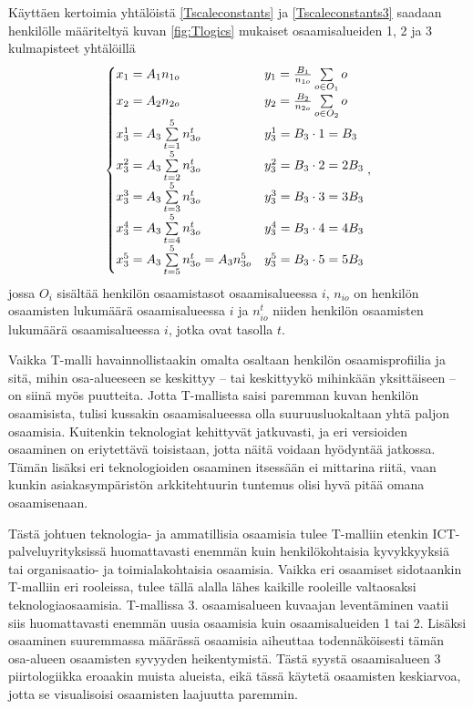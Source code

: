 \documentclass[a4paper,finnish,12pt]{article}
\begin{document}
Käyttäen kertoimia yhtälöistä \eqref{Tscaleconstants} ja \eqref{Tscaleconstants3} saadaan henkilölle määriteltyä kuvan \ref{fig:Tlogics} mukaiset osaamisalueiden 1, 2 ja 3 kulmapisteet yhtälöillä
\begin{equation}
\begin{cases}
x_1 = A_1 n_{1o} & y_1 = \frac{B_1}{n_{1o}} \sum\limits_{o \in O_1} o \\
x_2 = A_2 n_{2o} & y_2 = \frac{B_2}{n_{2o}} \sum\limits_{o \in O_2} o \\
x_3^1 = A_3 \sum\limits_{t = 1}^{5} n_{3o}^t & y_3^1 = B_3 \cdot 1 = B_3 \\
x_3^2 = A_3 \sum\limits_{t = 2}^{5} n_{3o}^t & y_3^2 = B_3 \cdot 2 = 2 B_3 \\
x_3^3 = A_3 \sum\limits_{t = 3}^{5} n_{3o}^t & y_3^3 = B_3 \cdot 3 = 3 B_3 \\
x_3^4 = A_3 \sum\limits_{t = 4}^{5} n_{3o}^t & y_3^4= B_3 \cdot 4 = 4 B_3 \\
x_3^5 = A_3 \sum\limits_{t = 5}^{5} n_{3o}^t = A_3 n_{3o}^5 & y_3^5 = B_3 \cdot 5 = 5 B_3
\end{cases} \\ ,
\end{equation} jossa $O_i$ sisältää henkilön osaamistasot osaamisalueessa $i$, $n_{io}$ on henkilön osaamisten lukumäärä osaamisalueessa $i$ ja $n_{io}^t$ niiden henkilön osaamisten lukumäärä osaamisalueessa $i$, jotka ovat tasolla $t$.

Vaikka T-malli havainnollistaakin omalta osaltaan henkilön osaamisprofiilia ja sitä, mihin osa-alueeseen se keskittyy -- tai keskittyykö mihinkään yksittäiseen -- on siinä myös puutteita. Jotta T-mallista saisi paremman kuvan henkilön osaamisista, tulisi kussakin osaamisalueessa olla suuruusluokaltaan yhtä paljon osaamisia. Kuitenkin teknologiat kehittyvät jatkuvasti, ja eri versioiden osaaminen on eriytettävä toisistaan, jotta näitä voidaan hyödyntää jatkossa. Tämän lisäksi eri teknologioiden osaaminen itsessään ei mittarina riitä, vaan kunkin asiakasympäristön arkkitehtuurin tuntemus olisi hyvä pitää omana osaamisenaan.

Tästä johtuen teknologia- ja ammatillisia osaamisia tulee T-malliin etenkin ICT-palveluyrityksissä huomattavasti enemmän kuin henkilökohtaisia kyvykkyyksiä tai organisaatio- ja toimialakohtaisia osaamisia. Vaikka eri osaamiset sidotaankin T-malliin eri rooleissa, tulee tällä alalla lähes kaikille rooleille valtaosaksi teknologiaosaamisia. T-mallissa 3. osaamisalueen kuvaajan leventäminen vaatii siis huomattavasti enemmän uusia osaamisia kuin osaamisalueiden 1 tai 2. Lisäksi osaaminen suuremmassa määrässä osaamisia aiheuttaa todennäköisesti tämän osa-alueen osaamisten syvyyden heikentymistä. Tästä syystä osaamisalueen 3 piirtologiikka eroaakin muista alueista, eikä tässä käytetä osaamisten keskiarvoa, jotta se visualisoisi osaamisten laajuutta paremmin.
\end{document}
